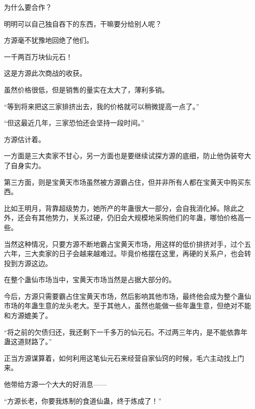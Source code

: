 \begin{this_body}
为什么要合作？

明明可以自己独自吞下的东西，干嘛要分给别人呢？

方源毫不犹豫地回绝了他们。

一千两百万块仙元石！

这是方源此次商战的收获。

虽然价格很低，但是销售的量实在太大了，薄利多销。

“等到将来把这三家排挤出去，我的价格就可以稍微提高一点了。”

“但这最近几年，三家恐怕还会坚持一段时间。”

方源估计着。

一方面是三大卖家不甘心，另一方面也是要继续试探方源的底细，防止他伪装夸大了自身实力。

第三方面，则是宝黄天市场虽然被方源霸占住，但并非所有人都在宝黄天中购买东西。

比如王明月，背靠超级势力，她所产的年蛊很大一部分，会自我消化掉。除此之外，还会有其他势力，关系过硬，仍旧会大规模地采购他们的年蛊，哪怕价格高一些。

当然这种情况，只要方源不断地霸占宝黄天市场，用这样的低价排挤对手，过个五六年，三大卖家的日子会越来越难过。毕竟价格摆在这里，再硬的关系户，也会转投到方源这边。

在整个蛊仙市场当中，宝黄天市场当然是占据大部分的。

今后，方源只需要霸占住宝黄天市场，然后影响其他市场，最终他会成为整个蛊仙市场的年蛊生意的龙头老大。至于其他人，虽然也能做一些年蛊生意，但绝对不能和方源媲美了。

“将之前的欠债归还，我还剩下一千多万的仙元石。不过两三年内，是不能依靠年蛊这道财路了。”

正当方源谋算着，如何利用这笔仙元石来经营自家仙窍的时候，毛六主动找上门来。

他带给方源一个大大的好消息——

“方源长老，你要我炼制的食道仙蛊，终于炼成了！”

\end{this_body}

